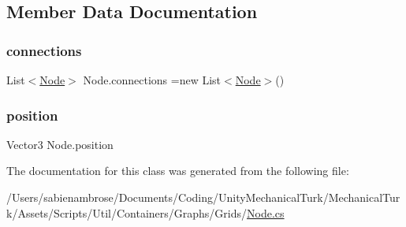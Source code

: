 \subsection{Member Data Documentation}
\mbox{\label{class_node_a1d236f5a6dd9111a6ed9f2ebbdea57ac}} 
\subsubsection{\texorpdfstring{connections}{connections}}
{\footnotesize\ttfamily List$<$\mbox{\hyperlink{class_node}{Node}}$>$ Node.\+connections =new List$<$\mbox{\hyperlink{class_node}{Node}}$>$()\hspace{0.3cm}{\ttfamily [protected]}}

\mbox{\label{class_node_a315059cd3874b8ca61426a4e1bd097a7}} 
\subsubsection{\texorpdfstring{position}{position}}
{\footnotesize\ttfamily Vector3 Node.\+position\hspace{0.3cm}{\ttfamily [protected]}}



The documentation for this class was generated from the following file\+:\begin{DoxyCompactItemize}
\item 
/\+Users/sabienambrose/\+Documents/\+Coding/\+Unity\+Mechanical\+Turk/\+Mechanical\+Turk/\+Assets/\+Scripts/\+Util/\+Containers/\+Graphs/\+Grids/\mbox{\hyperlink{_node_8cs}{Node.\+cs}}\end{DoxyCompactItemize}
